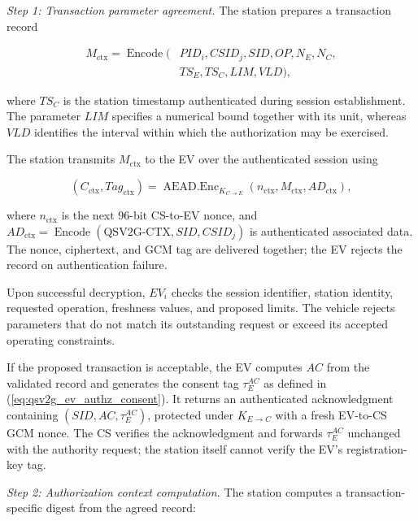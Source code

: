 \documentclass[twocolumn,10pt,journal]{IEEEtran}
\begin{document}
\textit{Step 1: Transaction parameter agreement.}
The station prepares a transaction record

\begin{equation}
\begin{aligned}
M_{\mathrm{ctx}}=\operatorname{Encode}\big(
&PID_i,CSID_j,SID,OP,N_E,N_C,\\
&TS_E,TS_C,LIM,VLD
\big),
\end{aligned}
\label{eq:qsv2g_context_record}
\end{equation}

where $TS_C$ is the station timestamp authenticated
during session establishment. The parameter $LIM$
specifies a numerical bound together with its unit,
whereas $VLD$ identifies the interval within which
the authorization may be exercised.

The station transmits $M_{\mathrm{ctx}}$ to the EV
over the authenticated session using

\begin{equation}
(C_{\mathrm{ctx}},Tag_{\mathrm{ctx}})
=
\operatorname{AEAD.Enc}_{K_{C\to E}}
(n_{\mathrm{ctx}},M_{\mathrm{ctx}},AD_{\mathrm{ctx}}),
\label{eq:qsv2g_context_offer}
\end{equation}

where $n_{\mathrm{ctx}}$ is the next 96-bit CS-to-EV nonce,
and $AD_{\mathrm{ctx}}=\operatorname{Encode}(
\mathrm{QSV2G\mbox{-}CTX},SID,CSID_j)$ is authenticated
associated data. The nonce, ciphertext, and GCM tag are delivered
together; the EV rejects the record on authentication failure.

Upon successful decryption, $EV_i$ checks the
session identifier, station identity, requested
operation, freshness values, and proposed limits.
The vehicle rejects parameters that do not match
its outstanding request or exceed its accepted
operating constraints.

If the proposed transaction is acceptable,
the EV computes $AC$ from the validated record
and generates the consent tag $\tau_E^{AC}$
as defined in (\ref{eq:qsv2g_ev_authz_consent}).
It returns an authenticated acknowledgment
containing $(SID,AC,\tau_E^{AC})$, protected under
$K_{E\to C}$ with a fresh EV-to-CS GCM nonce.
The CS verifies the acknowledgment and forwards
$\tau_E^{AC}$ unchanged with the authority request;
the station itself cannot verify the EV's registration-key tag.

\textit{Step 2: Authorization context computation.}
The station computes a transaction-specific digest
from the agreed record:
\end{document}
